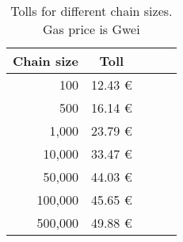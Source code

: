 \begin{table}[H]
    \centering
    \begin{tabular}{@{}lccll@{}}
        \toprule
        \multicolumn{1}{c}{\textbf{Chain size}} & \textbf{Toll}  \\ \midrule
        \multicolumn{1}{r}{    100} & \multicolumn{1}{r}{ 12.43 \euro{} } \\
        \multicolumn{1}{r}{    500} & \multicolumn{1}{r}{ 16.14 \euro{} } \\
        \multicolumn{1}{r}{  1,000} & \multicolumn{1}{r}{ 23.79 \euro{} } \\
        \multicolumn{1}{r}{ 10,000} & \multicolumn{1}{r}{ 33.47 \euro{} } \\
        \multicolumn{1}{r}{ 50,000} & \multicolumn{1}{r}{ 44.03 \euro{} } \\
        \multicolumn{1}{r}{100,000} & \multicolumn{1}{r}{ 45.65 \euro{} } \\
        \multicolumn{1}{r}{500,000} & \multicolumn{1}{r}{ 49.88 \euro{} } \\
        \bottomrule
    \end{tabular}
    \caption{Tolls for different chain sizes. Gas price is Gwei}
    \label{table:old_cost_in_fiat}
\end{table}
